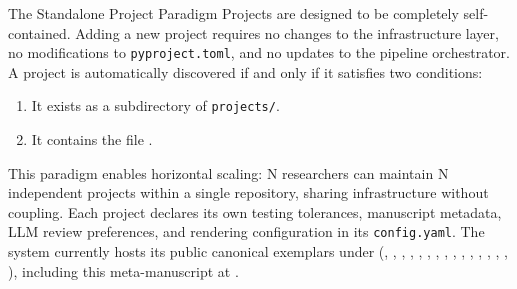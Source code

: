 \documentclass[
  ignorenonframetext,
]{beamer}
\providecommand{\tightlist}{%
  \setlength{\itemsep}{0pt}\setlength{\parskip}{0pt}}
\begin{document}
\begin{frame}{The Standalone Project Paradigm}
\protect{}\label{the-standalone-project-paradigm}
Projects are designed to be completely self-contained. Adding a new
project requires no changes to the infrastructure layer, no
modifications to \texttt{pyproject.toml}, and no updates to the pipeline
orchestrator. A project is automatically discovered if and only if it
satisfies two conditions:

\begin{enumerate}
\tightlist
\item
  It exists as a subdirectory of \texttt{projects/}.
\item
  It contains the file .
\end{enumerate}

This paradigm enables horizontal scaling: N researchers can maintain N
independent projects within a single repository, sharing infrastructure
without coupling. Each project declares its own testing tolerances,
manuscript metadata, LLM review preferences, and rendering configuration
in its \texttt{config.yaml}. The system currently hosts its public
canonical exemplars under 
(,
,
,
,
,
,
,
,
,
,
,
,
,
,
,
), including this meta-manuscript
at .
\end{frame}
\end{document}
